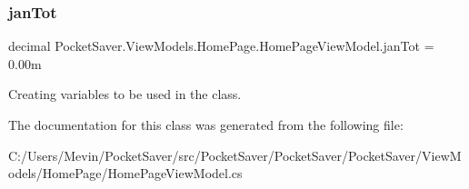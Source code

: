 \subsubsection{\texorpdfstring{jan\+Tot}{janTot}}
{\footnotesize\ttfamily decimal Pocket\+Saver.\+View\+Models.\+Home\+Page.\+Home\+Page\+View\+Model.\+jan\+Tot = 0.\+00m\hspace{0.3cm}{\ttfamily [static]}}



Creating variables to be used in the class. 



The documentation for this class was generated from the following file\+:\begin{DoxyCompactItemize}
\item 
C\+:/\+Users/\+Mevin/\+Pocket\+Saver/src/\+Pocket\+Saver/\+Pocket\+Saver/\+Pocket\+Saver/\+View\+Models/\+Home\+Page/Home\+Page\+View\+Model.\+cs\end{DoxyCompactItemize}
